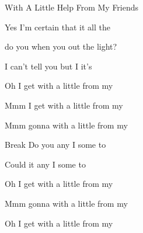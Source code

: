 \begin{SBSong}{With A Little Help From My Friends}
\begin{SBVerse}
	Yes I'm certain that it  all the 

	 do you  when you  out the light?

	I can't tell you but I   it's 
  \end{SBVerse}
  \begin{SBChorus} 
	Oh I get  with a little  from my 

	Mmm I get  with a little  from my 

	Mmm gonna  with a little  from my 
  \end{SBChorus}
  \begin{SBBracket}{Break}
    Do you  any I  some to 

	Could it  any  I  some to 
  \end{SBBracket}
  \begin{SBChorus} 
	Oh I get  with a little  from my 

	Mmm gonna   with a little  from my 

	Oh I get  with a little  from my 
  \end{SBChorus}
\end{SBSong}